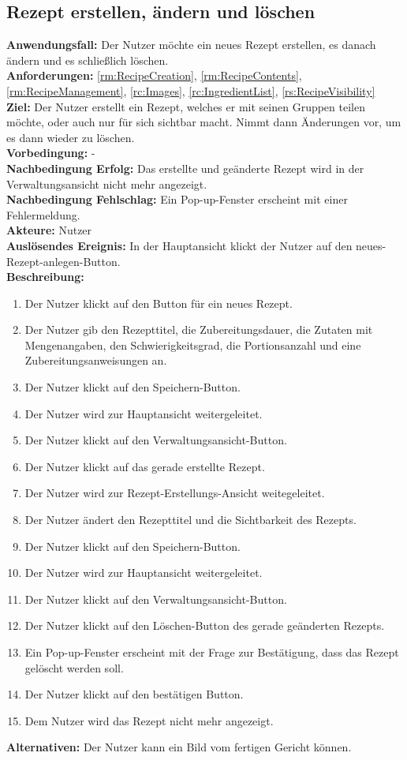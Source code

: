\documentclass[parskip=full]{scrartcl}
\begin{document}
\subsection{Rezept erstellen, ändern und löschen}
\textbf{Anwendungsfall:} Der Nutzer möchte ein neues Rezept erstellen, es danach ändern und es schließlich löschen.\\
\textbf{Anforderungen:} \ref{rm:RecipeCreation}, \ref{rm:RecipeContents}, \ref{rm:RecipeManagement}, \ref{rc:Images}, \ref{rc:IngredientList}, \ref{rs:RecipeVisibility}\\
\textbf{Ziel:} Der Nutzer erstellt ein Rezept, welches er mit seinen Gruppen teilen möchte, oder auch nur für sich sichtbar macht. Nimmt dann Änderungen vor, um es dann wieder zu löschen.\\
\textbf{Vorbedingung:} -\\
\textbf{Nachbedingung Erfolg:} Das erstellte und geänderte Rezept wird in der Verwaltungsansicht nicht mehr angezeigt.  \\
\textbf{Nachbedingung Fehlschlag:} Ein Pop-up-Fenster erscheint mit einer Fehlermeldung.\\
\textbf{Akteure:} Nutzer\\
\textbf{Auslösendes Ereignis:} In der Hauptansicht klickt der Nutzer auf den neues-Rezept-anlegen-Button.\\
\textbf{Beschreibung:}
\begin{enumerate}
    \item Der Nutzer klickt auf den Button für ein neues Rezept.
    \item Der Nutzer gib den Rezepttitel, die Zubereitungsdauer, die Zutaten mit Mengenangaben, den Schwierigkeitsgrad, die Portionsanzahl und eine Zubereitungsanweisungen an.
    \item Der Nutzer klickt auf den Speichern-Button.
    \item Der Nutzer wird zur Hauptansicht weitergeleitet.
    \item Der Nutzer klickt auf den Verwaltungsansicht-Button.
    \item Der Nutzer klickt auf das gerade erstellte Rezept.
    \item Der Nutzer wird zur Rezept-Erstellungs-Ansicht weitegeleitet.
    \item Der Nutzer ändert den Rezepttitel und die Sichtbarkeit des Rezepts.
    \item Der Nutzer klickt auf den Speichern-Button.
    \item Der Nutzer wird zur Hauptansicht weitergeleitet.
    \item Der Nutzer klickt auf den Verwaltungsansicht-Button.
    \item Der Nutzer klickt auf den Löschen-Button des gerade geänderten Rezepts.
    \item Ein Pop-up-Fenster erscheint mit der Frage zur Bestätigung, dass das Rezept gelöscht werden soll.
    \item Der Nutzer klickt auf den bestätigen Button.
    \item Dem Nutzer wird das Rezept nicht mehr angezeigt.
\end{enumerate}
\textbf{Alternativen:} Der Nutzer kann ein Bild vom fertigen Gericht können.
\newpage
\end{document}
